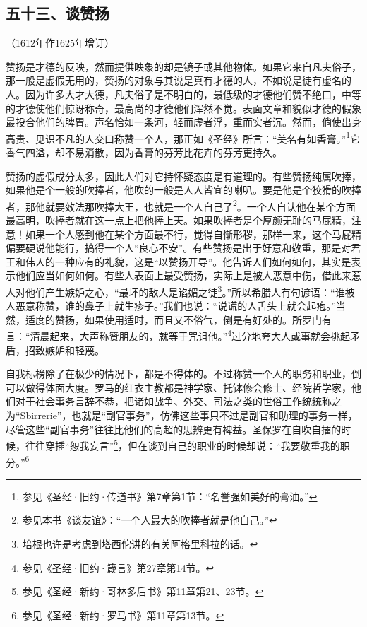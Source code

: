 \subsection*{五十三、谈赞扬}
\begin{center}
    （1612年作1625年增订）
\end{center}
\par 赞扬是才德的反映，然而提供映象的却是镜子或其他物体。如果它来自凡夫俗子，那一般是虚假无用的，赞扬的对象与其说是真有才德的人，不如说是徒有虚名的人。因为许多大才大德，凡夫俗子是不明白的，最低级的才德他们赞不绝口，中等的才德使他们惊讶称奇，最高尚的才德他们浑然不觉。表面文章和貌似才德的假象最投合他们的脾胃。声名恰如一条河，轻而虚者浮，重而实者沉。然而，倘使出身高贵、见识不凡的人交口称赞一个人，那正如《圣经》所言：“美名有如香膏。”\footnote{参见《圣经·旧约·传道书》第7章第1节：“名誉强如美好的膏油。”}它香气四溢，却不易消散，因为香膏的芬芳比花卉的芬芳更持久。
\par 赞扬的虚假成分太多，因此人们对它持怀疑态度是有道理的。有些赞扬纯属吹捧，如果他是个一般的吹捧者，他吹的一般是人人皆宜的喇叭。要是他是个狡猾的吹捧者，那他就要效法那吹捧大王，也就是一个人自己了\footnote{参见本书《谈友谊》：“一个人最大的吹捧者就是他自己。”}。一个人自认他在某个方面最高明，吹捧者就在这一点上把他捧上天。如果吹捧者是个厚颜无耻的马屁精，注意！如果一个人感到他在某个方面最不行，觉得自惭形秽，那样一来，这个马屁精偏要硬说他能行，搞得一个人“良心不安”。有些赞扬是出于好意和敬重，那是对君王和伟人的一种应有的礼貌，这是“以赞扬开导”。他告诉人们如何如何，其实是表示他们应当如何如何。有些人表面上最受赞扬，实际上是被人恶意中伤，借此来惹人对他们产生嫉妒之心，“最坏的敌人是谄媚之徒\footnote{培根也许是考虑到塔西佗讲的有关阿格里科拉的话。}。”所以希腊人有句谚语：“谁被人恶意称赞，谁的鼻子上就生疹子。”我们也说：“说谎的人舌头上就会起疱。”当然，适度的赞扬，如果使用适时，而且又不俗气，倒是有好处的。所罗门有言：“清晨起来，大声称赞朋友的，就等于咒诅他。”\footnote{参见《圣经·旧约·箴言》第27章第14节。}过分地夸大人或事就会挑起矛盾，招致嫉妒和轻蔑。
\par 自我标榜除了在极少的情况下，都是不得体的。不过称赞一个人的职务和职业，倒可以做得体面大度。罗马的红衣主教都是神学家、托钵修会修士、经院哲学家，他们对于社会事务言辞不恭，把诸如战争、外交、司法之类的世俗工作统统称之为“Sbirrerie”，也就是“副官事务”，仿佛这些事只不过是副官和助理的事务一样，尽管这些“副官事务”往往比他们的高超的思辨更有裨益。圣保罗在自吹自擂的时候，往往穿插“恕我妄言”\footnote{参见《圣经·新约·哥林多后书》第11章第21、23节。}，但在谈到自己的职业的时候却说：“我要敬重我的职分。”\footnote{参见《圣经·新约·罗马书》第11章第13节。}





